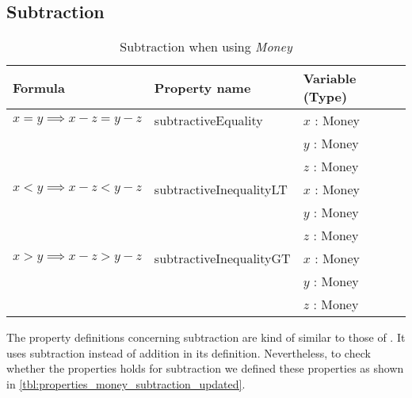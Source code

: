 \subsection*{Subtraction}
\label{ssct:properties_subtraction_updated}
\begin{table}[!ht]
\centering
\begin{tabular}{lll}
\hline
                        \textbf{Formula}               & \textbf{Property name}  & \textbf{Variable (Type)} \\ \hline
\rowcolor[HTML]{EFEFEF} $x = y \implies x - z = y - z$ & subtractiveEquality     & $x$ : Money              \\
\rowcolor[HTML]{EFEFEF}                                &                         & $y$ : Money              \\
\rowcolor[HTML]{EFEFEF}                                &                         & $z$ : Money              \\
                        $x < y \implies x - z < y - z$ & subtractiveInequalityLT & $x$ : Money              \\
                                                       &                         & $y$ : Money              \\
                                                       &                         & $z$ : Money              \\
\rowcolor[HTML]{EFEFEF} $x > y \implies x - z > y - z$ & subtractiveInequalityGT & $x$ : Money              \\
\rowcolor[HTML]{EFEFEF}                                &                         & $y$ : Money              \\
\rowcolor[HTML]{EFEFEF}                                &                         & $z$ : Money              \\ \hline
\end{tabular}
\caption{Subtraction when using \textit{Money}}
\label{tbl:properties_money_subtraction_updated}
\end{table}
\FloatBarrier\noindent
The property definitions concerning subtraction are kind of similar to those of
. It uses subtraction instead of
addition in its definition. Nevertheless, to check whether the properties holds
for subtraction we defined these properties as shown in
\autoref{tbl:properties_money_subtraction_updated}.
\clearpage %
